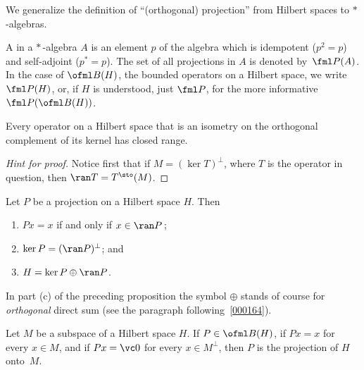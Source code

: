 We generalize the definition of ``(orthogonal) projection'' from Hilbert spaces to $*\,$-algebras.

\begin{defn} A
 in a $*\,$-algebra $A$ is an element $p$ of the algebra which is
idempotent ($p^2 = p$) and self-adjoint ($p^* = p$).  The set of all projections in $A$
is denoted
by~$\fml P(A)$.  In the case of $\ofml B(H)$, the bounded operators on a Hilbert space,
we write $\fml P(H)$,
or, if $H$ is understood, just $\fml P$, for the more informative $\fml P(\ofml B(H))$.
\end{defn}

\begin{prop} Every operator on a Hilbert space that is an isometry on the orthogonal complement of its kernel has closed range.
\end{prop}

\begin{proof}[\emph{Hint for proof}] Notice first that if $M = (\ker T)^\perp$, where $T$ is the operator in question, then
$\ran T = T^{\sto}(M)$.    \ns
\end{proof}

\begin{prop} Let $P$ be a projection on a Hilbert space $H$. Then
 \begin{enumerate}[label=\rm{(\alph*)}]
  \item $Px = x$ if and only if $x \in \ran P$\,;
  \item $\ker P = (\ran P)^\perp$; and
  \item $H = \ker P \oplus \ran P$.
 \end{enumerate}
\end{prop}

In part (c) of the preceding proposition the symbol $\oplus$ stands of course for
\emph{orthogonal} direct sum (see the paragraph following~\ref{000164}).

\begin{prop} Let $M$ be a subspace of a Hilbert space $H$.  If $P \in \ofml B(H)$, if $Px = x$
for every $x \in M$, and if $Px = \vc 0$ for every $x \in M^\perp$, then $P$ is the
projection of $H$ onto~$M$.
\end{prop}

